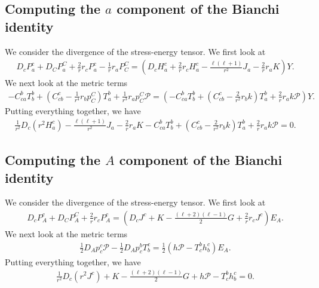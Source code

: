 \documentclass[12pt]{report}
\begin{document}
\subsection{Computing the $a$ component of the Bianchi identity}
    We consider the divergence of the stress-energy tensor.
We first look at
\begin{align}
    D_cP^c_a 
    +
    D_CP^C_a
    + 
    \frac{2}{r}r_cP^c_a 
    -
    \frac{1}{r}r_aP^C_C
    =
    \left(
        D_cH^c_a
        +
        \frac{2}{r}r_cH^c_a
        -
        \frac{\ell\left(\ell+1\right)}{r^2}J_a
        -
        \frac{2}{r}r_aK
    \right)
    Y
    .
\end{align}
We next look at the metric terms 
\begin{align}
    -
    C^b_{ca}T^b_b
    +
    \left(
        C^c_{cb}
        -
        \frac{1}{r^4}r_bp^C_C
    \right)
    T^b_a
    +
    \frac{1}{r^3}r_ap^C_C\mathcal{P}
    =
    \left(
        -
        C^b_{ca}T^b_b
        +
        \left(
            C^c_{cb}
            -
            \frac{2}{r^2}r_bk
        \right)
        T^b_a
        +
        \frac{2}{r}r_ak\mathcal{P}
    \right)
    Y
    .
\end{align}
    Putting everything together, we have
\begin{align}
    \label{eq:polar_comp_a_se_eom}
    \boxed{
        \frac{1}{r^2}D_c\left(r^2H^c_a\right)
        -
        \frac{\ell\left(\ell+1\right)}{r^2}J_a
        -
        \frac{2}{r}r_aK
        -
        C^b_{ca}T^b_b
        +
        \left(
            C^c_{cb}
            -
            \frac{2}{r^2}r_bk
        \right)
        T^b_a
        +
        \frac{2}{r}r_ak\mathcal{P}
        =
        0
        .
    }
\end{align}
\subsection{Computing the $A$ component of the Bianchi identity}
    We consider the divergence of the stress-energy tensor.
We first look at
\begin{align}
    D_cP^c_A
    +
    D_CP^C_A
    +
    \frac{2}{r}r_cP^c_A
    =
    \left(
        D_cJ^c
        +
        K
        -
        \frac{\left(\ell+2\right)\left(\ell-1\right)}{2}G
        +
        \frac{2}{r}r_cJ^c
    \right)
    E_A
    .
\end{align}
We next look at the metric terms
\begin{align}
    \frac{1}{2}D_Ap^c_c\mathcal{P}
    -
    \frac{1}{2}D_Ap^b_c T^c_b
    =
    \frac{1}{2}
    \left(
        h\mathcal{P}
        -
        T^b_ch^c_b
    \right)
    E_A
    .
\end{align}
Putting everything together, we have
\begin{align}
    \label{eq:polar_comp_A_se_eom}
    \boxed{
        \frac{1}{r^2}D_c\left(r^2J^c\right)
        +
        K
        -
        \frac{\left(\ell+2\right)\left(\ell-1\right)}{2}G
        +
        h\mathcal{P}
        -
        T^b_ch^c_b
        =
        0
        .
    }
\end{align}
\end{document}

